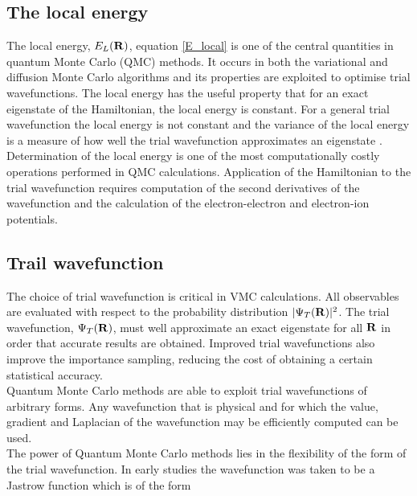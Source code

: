 \documentclass{article}
\begin{document}
\subsection{The local energy}

The local energy,  $E_{L}({\bf R})$, equation \ref{E_local} is one of the central quantities in quantum Monte Carlo (QMC) methods. It occurs in both the variational and diffusion Monte Carlo algorithms and its properties are exploited to optimise trial wavefunctions. The local energy has the useful property that for an exact eigenstate of the Hamiltonian, the local energy is constant. For a general trial wavefunction the local energy is not constant and the variance of the local energy is a measure of how well the trial wavefunction approximates an eigenstate \citep{phd}. \\

Determination of the local energy is one of the most computationally costly operations performed in QMC calculations. Application of the Hamiltonian to the trial wavefunction requires computation of the second derivatives of the wavefunction and the calculation of the electron-electron and electron-ion potentials.

\subsection{Trail wavefunction}

The choice of trial wavefunction is critical in VMC calculations. All observables are evaluated with respect to the probability distribution  $\vert\Psi_T({\bf R})\vert^2$. The trial wavefunction,  $\Psi_T({\bf R})$, must well approximate an exact eigenstate for all ${\bf R}$ in order that accurate results are obtained. Improved trial wavefunctions also improve the importance sampling, reducing the cost of obtaining a certain statistical accuracy.\\

Quantum Monte Carlo methods are able to exploit trial wavefunctions of arbitrary forms. Any wavefunction that is physical and for which the value, gradient and Laplacian of the wavefunction may be efficiently computed can be used\citep{phd}. \\

The power of Quantum Monte Carlo methods lies in the flexibility of the form of the trial wavefunction. In early studies the wavefunction was taken to be a Jastrow function \citep{jastrow1955many} which is of the form
\end{document}
